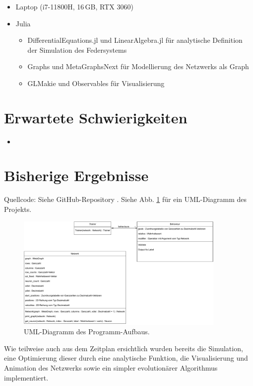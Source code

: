 \documentclass[parskip]{scrartcl}
\begin{document}
\begin{itemize}
    \item Laptop (i7-11800H, 16\,GB, RTX 3060)
    \item Julia
    \begin{itemize}
        \item DifferentialEquations.jl und LinearAlgebra.jl für analytische Definition der Simulation des Federsystems
        \item Graphs und MetaGraphsNext für Modellierung des Netzwerks als Graph
        \item GLMakie und Observables für Visualisierung
    \end{itemize}
\end{itemize}

\section{Erwartete Schwierigkeiten}

\begin{itemize}
    \item 
\end{itemize}

\section{Bisherige Ergebnisse}

Quellcode: Siehe GitHub-Repository \cite{RepoMNN}.
Siehe Abb. \ref{fig:uml} für ein UML-Diagramm des Projekts.

\begin{figure}
    \centering
    \includegraphics[width=0.9\textwidth]{bilder/uml.pdf}
    \caption{UML-Diagramm des Programm-Aufbaus.}
    \label{fig:uml}
\end{figure}

Wie teilweise auch aus dem Zeitplan ersichtlich wurden bereits die Simulation, eine Optimierung dieser durch eine analytische Funktion, die Visualisierung und Animation des Netzwerks sowie ein simpler evolutionärer Algorithmus implementiert.
\end{document}
